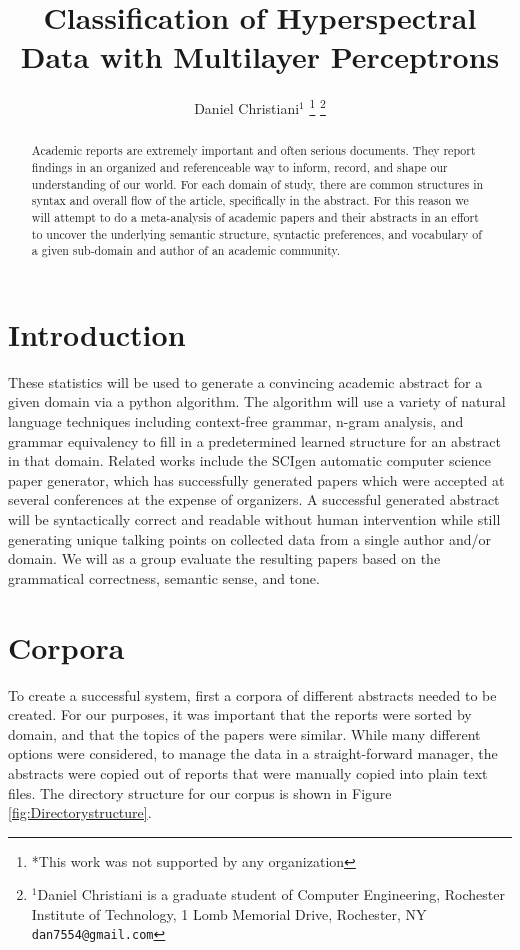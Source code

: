 \documentclass[letterpaper, 10 pt, conference]{ieeeconf}  %
\title{\LARGE \bf
Classification of Hyperspectral Data with Multilayer Perceptrons
}
\author{Daniel Christiani$^{1}$%
\thanks{*This work was not supported by any organization}%
\thanks{$^{1}$Daniel Christiani is a graduate student of Computer Engineering,
        Rochester Institute of Technology, 1 Lomb Memorial Drive, Rochester, NY
        {\tt\small dan7554@gmail.com}}%
}
\begin{document}
\maketitle

\begin{abstract}
	Academic reports are extremely important and often serious documents. They report findings in an organized and referenceable way to inform, record, and shape our understanding of our world. For each domain of study, there are common structures in syntax and overall flow of the article, specifically in the abstract. For this reason we will attempt to do a meta-analysis of academic papers and their abstracts in an effort to uncover the underlying semantic structure, syntactic preferences, and vocabulary of a given sub-domain and author of an academic community. 
\end{abstract}


\section{Introduction}

These statistics will be used to generate a convincing academic abstract for a given domain via a python algorithm. The algorithm will use a variety of natural language techniques including context-free grammar, n-gram analysis, and grammar equivalency to fill in a predetermined learned structure for an abstract in that domain. Related works include the SCIgen automatic computer science paper generator, which has successfully generated papers which were accepted at several conferences at the expense of organizers. A successful generated abstract will be syntactically correct and readable without human intervention while still generating unique talking points on collected data from a single author and/or domain. We will as a group evaluate the resulting papers based on the grammatical correctness, semantic sense, and tone.

\section{Corpora}

To create a successful system, first a corpora of different abstracts needed to be created. For our purposes, it was important that the reports were sorted by domain, and that the topics of the papers were similar. While many different options were considered, to manage the data in a straight-forward manager, the abstracts were copied out of reports that were manually copied into plain text files. The directory structure for our corpus is shown in Figure  \ref{fig:Directorystructure}.
\end{document}

